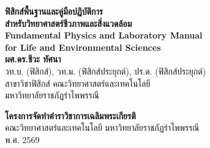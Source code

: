 \begin{titlepage}
\thispagestyle{empty}
\begin{center}
    \vspace*{1.5cm}
    
    {\Huge\bfseries\color{physRoyalBlue} ฟิสิกส์พื้นฐานและคู่มือปฏิบัติการ}\\[0.5cm]
    {\LARGE\bfseries\color{physAmber} สำหรับวิทยาศาสตร์ชีวภาพและสิ่งแวดล้อม}\\[0.8cm]
    
    {\large\bfseries\color{physSlate} Fundamental Physics and Laboratory Manual\\for Life and Environmental Sciences}\\[2.0cm]
    
    {\Large\bfseries ผศ.ดร.ชีวะ ทัศนา}\\[0.3cm]
    {\normalsize วท.บ. (ฟิสิกส์), วท.ม. (ฟิสิกส์ประยุกต์), ปร.ด. (ฟิสิกส์ประยุกต์)}\\[0.2cm]
    {\normalsize สาขาวิชาฟิสิกส์ คณะวิทยาศาสตร์และเทคโนโลยี}\\[0.2cm]
    {\normalsize มหาวิทยาลัยราชภัฏรำไพพรรณี}\\[2.5cm]
    
    \begin{tcolorbox}[
        enhanced,
        colback=softSmoke,
        colframe=physRoyalBlue,
        width=14cm,
        arc=2mm,
        halign=center
    ]
        {\small\bfseries โครงการจัดทำตำราวิชาการเฉลิมพระเกียรติ}\\[2pt]
        {\footnotesize คณะวิทยาศาสตร์และเทคโนโลยี มหาวิทยาลัยราชภัฏรำไพพรรณี}\\[2pt]
        {\footnotesize พ.ศ. 2569}
    \end{tcolorbox}
    
\end{center}
\end{titlepage}
